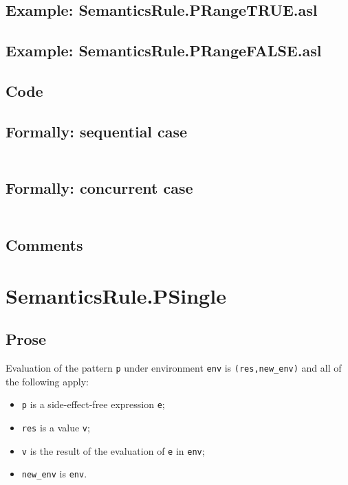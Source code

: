 \documentclass{book}
\begin{document}
    \subsection{Example: SemanticsRule.PRangeTRUE.asl}

    \subsection{Example: SemanticsRule.PRangeFALSE.asl}

  \subsection{Code}

  \subsection{Formally: sequential case}
  \begin{align}
  \end{align} 

  \subsection{Formally: concurrent case}
  \begin{align}
  \end{align} 

    \subsection{Comments}

\section{SemanticsRule.PSingle \label{sec:SemanticsRule.PSingle}}

    \subsection{Prose}
   Evaluation of the pattern \texttt{p} under environment \texttt{env} is
  \texttt{(res,new\_env)} and all of the following apply:
    \begin{itemize}
    \item \texttt{p} is a side-effect-free expression \texttt{e};
    \item \texttt{res} is a value \texttt{v};
    \item \texttt{v} is the result of the evaluation of \texttt{e} in \texttt{env};
    \item \texttt{new\_env} is \texttt{env}.
    \end{itemize}
\end{document}
